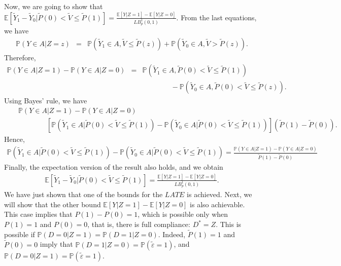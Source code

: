 \documentclass[11pt,reqno]{amsart}
\theoremstyle{plain}
\numberwithin{equation}{section}
\begin{document}
Now, we are going to show that $\mathbb E[\tilde{Y}_1-\tilde{Y}_0 \vert \tilde{P}(0) < \tilde{V} \leq \tilde{P}(1)]=\frac{\mathbb E[Y\vert Z=1]-\mathbb E[Y\vert Z=0]}{LB^1_p(0,1)}$. From the last equations, we have
\begin{eqnarray*}
\mathbb P(Y\in A \vert Z=z) &=& \mathbb P(\tilde{Y}_1\in A, \tilde{V} \leq \tilde{P}(z)) + \mathbb P(\tilde{Y}_0\in A, \tilde{V} > \tilde{P}(z)).
\end{eqnarray*}
Therefore,
\begin{eqnarray*}
\mathbb P(Y\in A \vert Z=1) - \mathbb P(Y\in A \vert Z=0) &=& \mathbb P(\tilde{Y}_1\in A, \tilde{P}(0) < \tilde{V} \leq \tilde{P}(1))\\
&&\qquad \qquad - \mathbb P(\tilde{Y}_0\in A, \tilde{P}(0) < \tilde{V} \leq \tilde{P}(z)).
\end{eqnarray*}
Using Bayes' rule, we have
\begin{eqnarray*}
&& \mathbb P(Y\in A \vert Z=1) - \mathbb P(Y\in A \vert Z=0) \\
&&\qquad \qquad \left[\mathbb P(\tilde{Y}_1\in A \vert \tilde{P}(0) < \tilde{V} \leq \tilde{P}(1))- \mathbb P(\tilde{Y}_0\in A \vert \tilde{P}(0) < \tilde{V} \leq \tilde{P}(1))\right] \left(\tilde{P}(1)-\tilde{P}(0)\right).
\end{eqnarray*}
Hence,
\begin{eqnarray*}
\mathbb P(\tilde{Y}_1\in A \vert \tilde{P}(0) < \tilde{V} \leq \tilde{P}(1))- \mathbb P(\tilde{Y}_0\in A \vert \tilde{P}(0) < \tilde{V} \leq \tilde{P}(1))=\frac{\mathbb P(Y\in A \vert Z=1) - \mathbb P(Y\in A \vert Z=0)}{\tilde{P}(1)-\tilde{P}(0)} 
\end{eqnarray*}
Finally, the expectation version of the result also holds, and we obtain
\begin{eqnarray*}
\mathbb E[\tilde{Y}_1 -\tilde{Y}_0 \vert \tilde{P}(0) < \tilde{V} \leq \tilde{P}(1)]=\frac{\mathbb E[Y \vert Z=1] - \mathbb E[Y\vert Z=0]}{LB^1_p(0,1)}. 
\end{eqnarray*}
We have just shown that one of the bounds for the $LATE$ is achieved. Next, we will show that the other bound $\mathbb E[Y \vert Z=1] - \mathbb E[Y\vert Z=0]$  is also achievable. This case implies that $P(1)-P(0)=1$, which is possible only when $P(1)=1$ and $P(0)=0$, that is, there is full compliance: $D^*=Z$. This is possible if $\mathbb P(D=0\vert Z=1)=\mathbb P(D=1\vert Z=0)$. Indeed, $\tilde{P}(1)=1$ and $\tilde{P}(0)=0$ imply that $\mathbb P(D=1\vert Z=0)=\mathbb P(\tilde{\varepsilon}=1)$, and $\mathbb P(D=0\vert Z=1)=\mathbb P(\tilde{\varepsilon}=1)$.
 
\end{document}
